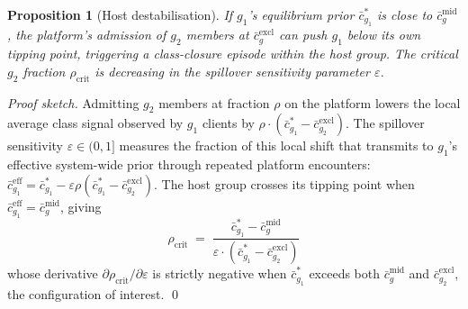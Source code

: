\documentclass[12pt,a4paper]{article}
\newtheorem{proposition}{Proposition}
\theoremstyle{definition}
\numberwithin{proposition}{subsection}
\begin{document}
\begin{proposition}[Host destabilisation]
\label{prop:spillover}
If $g_1$'s equilibrium prior $\bar{c}_{g_1}^*$ is close to
$\bar{c}_g^{\mathrm{mid}}$, the platform's admission of $g_2$ members
at $\bar{c}_g^{\mathrm{excl}}$ can push $g_1$ below its own tipping
point, triggering a class-closure episode within the host group. The
critical $g_2$ fraction $\rho_{\mathrm{crit}}$ is decreasing in the
spillover sensitivity parameter $\varepsilon$.
\end{proposition}

\begin{proof}[Proof sketch]
Admitting $g_2$ members at fraction $\rho$ on the platform lowers
the local average class signal observed by $g_1$ clients by
$\rho \cdot (\bar{c}_{g_1}^* - \bar{c}_{g_2}^{\mathrm{excl}})$. The
spillover sensitivity $\varepsilon \in (0, 1]$ measures the fraction
of this local shift that transmits to $g_1$'s effective system-wide
prior through repeated platform encounters:
$\bar{c}_{g_1}^{\mathrm{eff}} = \bar{c}_{g_1}^*
- \varepsilon \rho (\bar{c}_{g_1}^* - \bar{c}_{g_2}^{\mathrm{excl}})$.
The host group crosses its tipping point when
$\bar{c}_{g_1}^{\mathrm{eff}} = \bar{c}_g^{\mathrm{mid}}$, giving
\[
  \rho_{\mathrm{crit}}
  \;=\; \frac{\bar{c}_{g_1}^* - \bar{c}_g^{\mathrm{mid}}}
  {\varepsilon \cdot (\bar{c}_{g_1}^* - \bar{c}_{g_2}^{\mathrm{excl}})}
\]
whose derivative
$\partial \rho_{\mathrm{crit}} / \partial \varepsilon$ is strictly
negative when $\bar{c}_{g_1}^*$ exceeds both $\bar{c}_g^{\mathrm{mid}}$
and $\bar{c}_{g_2}^{\mathrm{excl}}$, the configuration of interest.
\qed
\end{proof}
\end{document}
